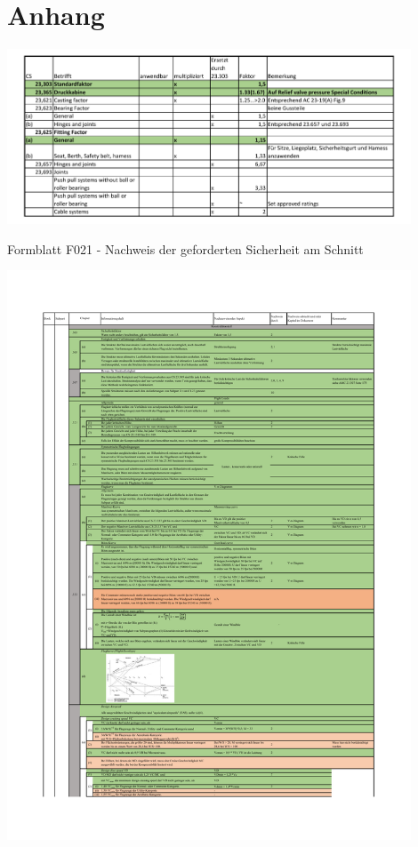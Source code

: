 \chapter{Anhang}

\begin{table}[H]
\centering
\includegraphics[width=0.9\textwidth]{bilder/Tabellen/Sicherheitsfaktoren.pdf}
\caption{Formblatt F021 - Nachweis der geforderten Sicherheit am Schnitt} 
\label{tab:Sicherheiten}
\end{table}

\clearpage

\begin{table}[H]
\centering
\includegraphics[width=0.9\textwidth]{bilder/Tabellen/MPP_Konstruktion_1.pdf}
\end{table}

